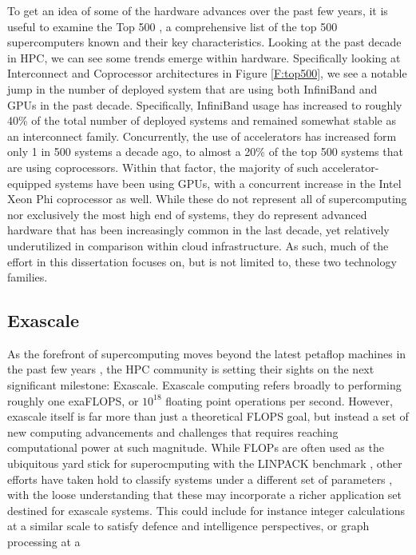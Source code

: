 To get an idea of some of the hardware advances over the past few years, it is useful to examine the Top 500 \cite{www-top500}, a comprehensive list of the top 500 supercomputers known and their key characteristics.  Looking at the past decade in HPC, we can see some trends emerge within hardware. Specifically looking at Interconnect and Coprocessor architectures in Figure \ref{F:top500}, we see a notable jump in the number of deployed system that are using both InfiniBand and GPUs in the past decade. Specifically, InfiniBand usage has increased to roughly 40\% of the total number of deployed systems and remained somewhat stable as an interconnect family. Concurrently, the use of accelerators has increased form only 1 in 500 systems a decade ago, to almost a 20\% of the top 500 systems that are using coprocessors. Within that factor, the majority of such accelerator-equipped systems have been using GPUs, with a concurrent increase in the Intel Xeon Phi coprocessor as well.  While these do not represent all of supercomputing nor exclusively the most high end of systems, they do represent advanced hardware that has been increasingly common in the last decade, yet relatively underutilized in comparison within cloud infrastructure. As such, much of the effort in this dissertation focuses on, but is not limited to,  these two technology families.    




\subsection{Exascale}

As the forefront of supercomputing moves beyond the latest petaflop machines in the past few years \cite{bland2012titan}, the HPC community is setting their sights on the next significant milestone: Exascale. Exascale computing refers broadly to performing roughly one exaFLOPS, or $10^{18}$ floating point operations per second. However, exascale itself is far more than just a theoretical FLOPS goal, but instead a set of new computing advancements and challenges that requires reaching computational power at such magnitude.  While FLOPs are often used as the ubiquitous yard stick for superocmputing with the LINPACK benchmark \cite{dongarra2003linpack,}, other efforts have taken hold to classify systems under a different set of parameters \cite{murphy2010graph500, dongarra2013hpcg}, with the loose understanding that these may incorporate a richer application set destined for exascale systems.  This could include for instance integer calculations at a similar scale to satisfy defence and intelligence perspectives, or graph processing at a 

